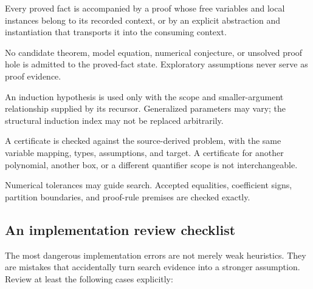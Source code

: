 \begin{invariant}
Every proved fact is accompanied by a proof whose free variables and local
instances belong to its recorded context, or by an explicit abstraction and
instantiation that transports it into the consuming context.
\end{invariant}

\begin{invariant}
No candidate theorem, model equation, numerical conjecture, or unsolved proof
hole is admitted to the proved-fact state. Exploratory assumptions never serve
as proof evidence.
\end{invariant}

\begin{invariant}
An induction hypothesis is used only with the scope and smaller-argument
relationship supplied by its recursor. Generalized parameters may vary;
the structural induction index may not be replaced arbitrarily.
\end{invariant}

\begin{invariant}
A certificate is checked against the source-derived problem, with the same
variable mapping, types, assumptions, and target. A certificate for another
polynomial, another box, or a different quantifier scope is not interchangeable.
\end{invariant}

\begin{invariant}
Numerical tolerances may guide search. Accepted equalities, coefficient signs,
partition boundaries, and proof-rule premises are checked exactly.
\end{invariant}

\subsection{An implementation review checklist}

The most dangerous implementation errors are not merely weak heuristics.
They are mistakes that accidentally turn search evidence into a stronger
assumption. Review at least the following cases explicitly:

